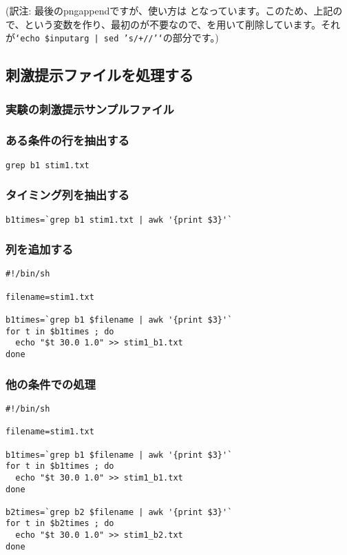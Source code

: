 \documentclass{jsarticle}
\begin{document}
\noindent (訳注: 最後のpngappendですが、使い方は となっています。このため、上記ので、という変数を作り、最初の\Q{+}が不要なので、を用いて削除しています。それが{\tt `echo \$inputarg | sed 's/+//'`}の部分です。)


\subsection{刺激提示ファイルを処理する}

\subsubsection{実験の刺激提示サンプルファイル}

\subsubsection{ある条件の行を抽出する}

\begin{verbatim}
grep b1 stim1.txt
\end{verbatim}

\subsubsection{タイミング列を抽出する}

\begin{verbatim}
b1times=`grep b1 stim1.txt | awk '{print $3}'`
\end{verbatim}

\subsubsection{列を追加する}

\begin{verbatim}
#!/bin/sh

filename=stim1.txt

b1times=`grep b1 $filename | awk '{print $3}'`
for t in $b1times ; do
  echo "$t 30.0 1.0" >> stim1_b1.txt
done
\end{verbatim}

\subsubsection{他の条件での処理}

\begin{verbatim}
#!/bin/sh

filename=stim1.txt

b1times=`grep b1 $filename | awk '{print $3}'`
for t in $b1times ; do
  echo "$t 30.0 1.0" >> stim1_b1.txt
done

b2times=`grep b2 $filename | awk '{print $3}'`
for t in $b2times ; do
  echo "$t 30.0 1.0" >> stim1_b2.txt
done
\end{verbatim}
\end{document}
